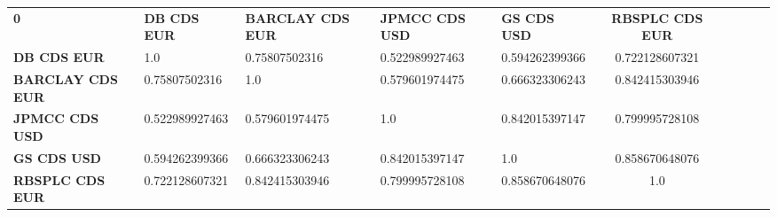 \begin{center}
 \begin{tabular}{|l|l|l|l|l|c|c|c|c|c|}
\hline
\textbf{0} & \textbf{DB CDS EUR} & \textbf{BARCLAY CDS EUR} & \textbf{JPMCC CDS USD} & \textbf{GS CDS USD} & \textbf{RBSPLC CDS EUR}\\\hhline{|=|=|=|=|=|=|}
\textbf{DB CDS EUR} & 1.0 & 0.75807502316 & 0.522989927463 & 0.594262399366 & 0.722128607321\\
\textbf{BARCLAY CDS EUR} & 0.75807502316 & 1.0 & 0.579601974475 & 0.666323306243 & 0.842415303946\\
\textbf{JPMCC CDS USD} & 0.522989927463 & 0.579601974475 & 1.0 & 0.842015397147 & 0.799995728108\\
\textbf{GS CDS USD} & 0.594262399366 & 0.666323306243 & 0.842015397147 & 1.0 & 0.858670648076\\
\textbf{RBSPLC CDS EUR} & 0.722128607321 & 0.842415303946 & 0.799995728108 & 0.858670648076 & 1.0\\
\hline
\end{tabular}
\end{center}